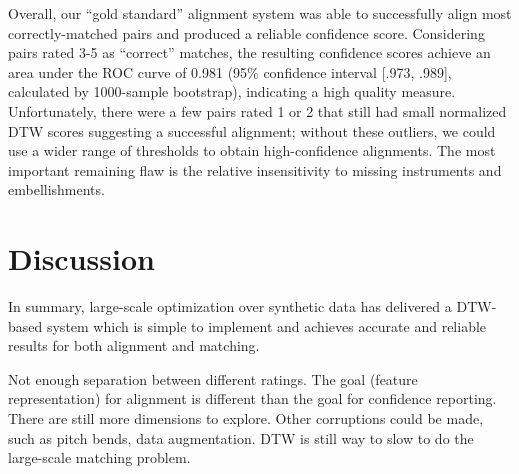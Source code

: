 Overall, our ``gold standard'' alignment system was able to successfully align most correctly-matched pairs and produced a reliable confidence score.
Considering pairs rated 3-5 as ``correct'' matches, the resulting confidence scores achieve an area under the ROC curve of 0.981 (95\% confidence interval [.973, .989], calculated by 1000-sample bootstrap), indicating a high quality measure.
Unfortunately, there were a few pairs rated 1 or 2 that still had small normalized DTW scores suggesting a successful alignment; without these outliers, we could use a wider range of thresholds to obtain high-confidence alignments.
The most important remaining flaw is the relative insensitivity to missing instruments and embellishments.

\section{Discussion}
\label{sec:discussion}

In summary, large-scale optimization over synthetic data has delivered a DTW-based system which is simple to implement and achieves accurate and reliable results for both alignment and matching.

Not enough separation between different ratings.
The goal (feature representation) for alignment is different than the goal for confidence reporting.
There are still more dimensions to explore.
Other corruptions could be made, such as pitch bends, data augmentation.
DTW is still way to slow to do the large-scale matching problem.
